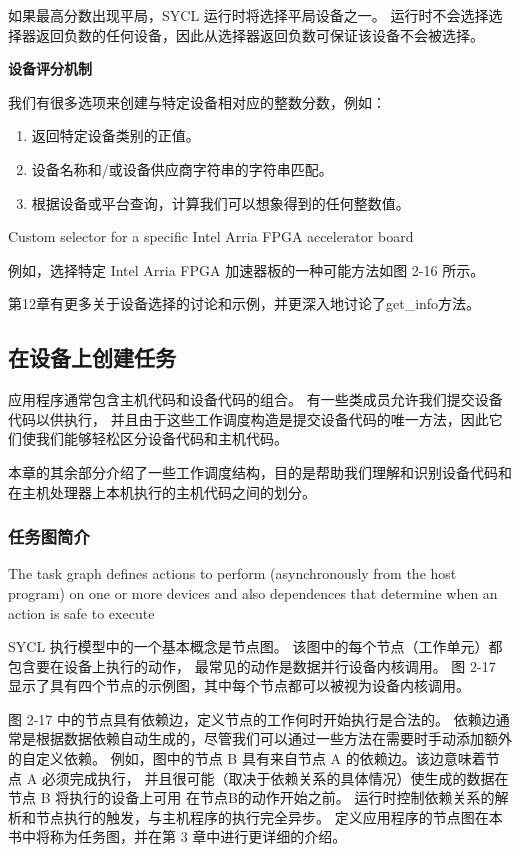 如果最高分数出现平局，SYCL 运行时将选择平局设备之一。 
运行时不会选择选择器返回负数的任何设备，因此从选择器返回负数可保证该设备不会被选择。

\textbf{设备评分机制}

我们有很多选项来创建与特定设备相对应的整数分数，例如：

\begin{enumerate}
	\item 返回特定设备类别的正值。

	\item 设备名称和/或设备供应商字符串的字符串匹配。

	\item 根据设备或平台查询，计算我们可以想象得到的任何整数值。
\end{enumerate}

{\color{red} Custom selector for a specific Intel Arria FPGA accelerator board }

例如，选择特定 Intel Arria FPGA 加速器板的一种可能方法如图 2-16 所示。

第12章有更多关于设备选择的讨论和示例，并更深入地讨论了get\_info方法。

\subsection{在设备上创建任务}
应用程序通常包含主机代码和设备代码的组合。 有一些类成员允许我们提交设备代码以供执行，
并且由于这些工作调度构造是提交设备代码的唯一方法，因此它们使我们能够轻松区分设备代码和主机代码。

本章的其余部分介绍了一些工作调度结构，目的是帮助我们理解和识别设备代码和在主机处理器上本机执行的主机代码之间的划分。

\subsubsection{任务图简介}
{\color{red} The task graph defines actions to perform (asynchronously from the host program) on one or more devices and also dependences that determine when an action is safe to execute}

SYCL 执行模型中的一个基本概念是节点图。 该图中的每个节点（工作单元）都包含要在设备上执行的动作，
最常见的动作是数据并行设备内核调用。 图 2-17 显示了具有四个节点的示例图，其中每个节点都可以被视为设备内核调用。

图 2-17 中的节点具有依赖边，定义节点的工作何时开始执行是合法的。 
依赖边通常是根据数据依赖自动生成的，尽管我们可以通过一些方法在需要时手动添加额外的自定义依赖。 
例如，图中的节点 B 具有来自节点 A 的依赖边。该边意味着节点 A 必须完成执行，
并且很可能（取决于依赖关系的具体情况）使生成的数据在节点 B 将执行的设备上可用 在节点B的动作开始之前。 
运行时控制依赖关系的解析和节点执行的触发，与主机程序的执行完全异步。 
定义应用程序的节点图在本书中将称为任务图，并在第 3 章中进行更详细的介绍。

